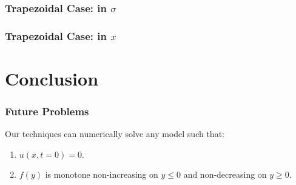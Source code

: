 \documentclass[xcolor=dvipsnames]{beamer}
\newcommand{\be}{\begin{enumerate}}
\newcommand{\ee}{\end{enumerate}}
\begin{document}
\begin{frame}
\frametitle{Trapezoidal Case: in $\sigma$}
\begin{center}
\end{center}
\end{frame}

\begin{frame}
\frametitle{Trapezoidal Case: in $x$}
\begin{center}
\end{center}
\end{frame}

\section{Conclusion}
\begin{frame}
\frametitle{Future Problems}
Our techniques can numerically solve any model such that:
\be
\item $u(x,t=0) = 0$.
\item $f(y)$ is monotone non-increasing on $y \leq 0$ and non-decreasing on $y \geq 0$.
\ee
\end{frame}
\end{document}
